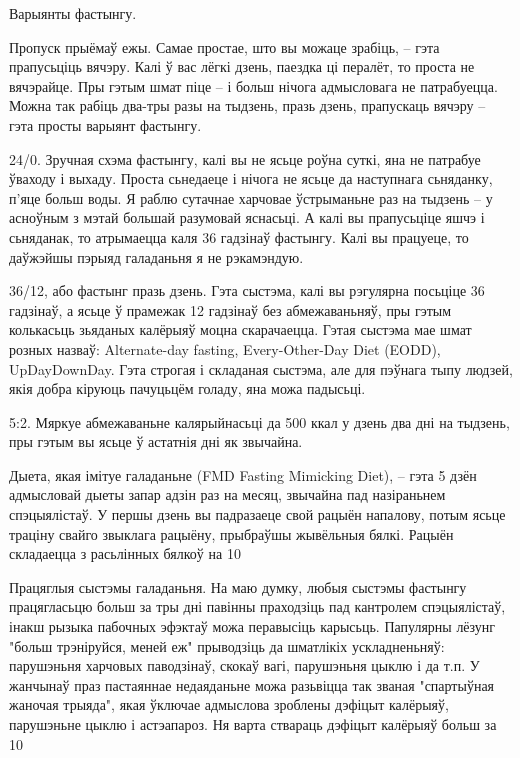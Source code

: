 Варыянты фастынгу.

Пропуск прыёмаў ежы. Самае простае, што вы можаце зрабіць, – гэта прапусьціць вячэру. Калі ў вас лёгкі дзень, паездка ці пералёт, то проста не вячэрайце. Пры гэтым шмат піце – і больш нічога адмысловага не патрабуецца. Можна так рабіць два-тры разы на тыдзень, празь дзень, прапускаць вячэру – гэта просты варыянт фастынгу.

24/0. Зручная схэма фастынгу, калі вы не ясьце роўна суткі, яна не патрабуе ўваходу і выхаду. Проста сьнедаеце і нічога не ясьце да наступнага сьняданку, п'яце больш воды. Я раблю сутачнае харчовае ўстрыманьне раз на тыдзень – у асноўным з мэтай большай разумовай яснасьці. А калі вы прапусьціце яшчэ і сьняданак, то атрымаецца каля 36 гадзінаў фастынгу. Калі вы працуеце, то даўжэйшы пэрыяд галаданьня я не рэкамэндую.

36/12, або фастынг празь дзень. Гэта сыстэма, калі вы рэгулярна посьціце 36 гадзінаў, а ясьце ў прамежак 12 гадзінаў без абмежаваньняў, пры гэтым колькасьць зьяданых калёрыяў моцна скарачаецца. Гэтая сыстэма мае шмат розных назваў: Alternate-day fasting, Every-Other-Day Diet (EODD), UpDayDownDay. Гэта строгая і складаная сыстэма, але для пэўнага тыпу людзей, якія добра кіруюць пачуцьцём голаду, яна можа падысьці.

5:2. Мяркуе абмежаваньне калярыйнасьці да 500 ккал у дзень два дні на тыдзень, пры гэтым вы ясьце ў астатнія дні як звычайна.

Дыета, якая імітуе галаданьне (FMD Fasting Mimicking Diet), – гэта 5 дзён адмысловай дыеты запар адзін раз на месяц, звычайна пад назіраньнем спэцыялістаў. У першы дзень вы падразаеце свой рацыён напалову, потым ясьце траціну свайго звыклага рацыёну, прыбраўшы жывёльныя бялкі. Рацыён складаецца з расьлінных бялкоў на 10%

Працяглыя сыстэмы галаданьня. На маю думку, любыя сыстэмы фастынгу працягласьцю больш за тры дні павінны праходзіць пад кантролем спэцыялістаў, інакш рызыка пабочных эфэктаў можа перавысіць карысьць. Папулярны лёзунг "больш трэніруйся, меней еж" прыводзіць да шматлікіх ускладненьняў: парушэньня харчовых паводзінаў, скокаў вагі, парушэньня цыклю і да т.п. У жанчынаў праз пастаяннае недаяданьне можа разьвіцца так званая "спартыўная жаночая трыяда", якая ўключае адмыслова зроблены дэфіцыт калёрыяў, парушэньне цыклю і астэапароз. Ня варта ствараць дэфіцыт калёрыяў больш за 10%


